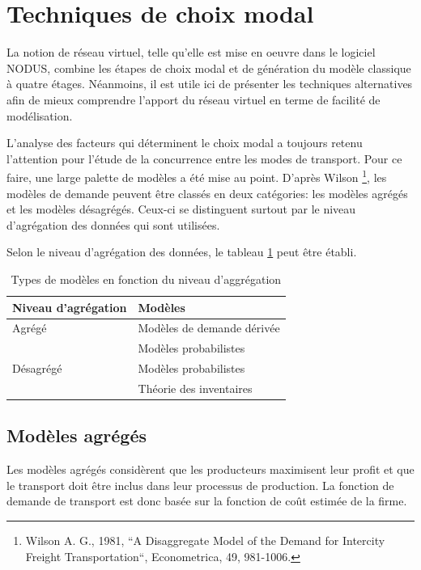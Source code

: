 \section{Techniques de choix modal}

La notion de réseau virtuel, telle qu'elle est mise en oeuvre dans le logiciel
NODUS, combine les étapes de choix modal et de génération du modèle classique à
quatre étages. Néanmoins, il est utile ici de présenter les techniques
alternatives afin de mieux comprendre l'apport du réseau virtuel en terme de
facilité de modélisation.

L'analyse des facteurs qui déterminent le choix modal a toujours
retenu l'atten\-tion pour l'étude de la concurrence entre les modes
de transport. Pour ce faire, une large palette de modèles a été
mise au point. D'après Wilson
\footnote{Wilson A. G., 1981, ``A Disaggregate Model of the Demand
for Intercity Freight Transportation``, Econometrica, 49,
981-1006.}, les modèles de demande peuvent être classés en deux
catégories: les modèles agrégés et les modèles désagrégés. Ceux-ci
se distinguent surtout par le niveau d'agrégation des données qui
sont utilisées.

Selon le niveau d'agrégation des données, le tableau \ref{tab2_6} peut être
établi.

\begin{table}
\begin{center}
\begin{tabular}{ll}
\hline
Niveau d'agrégation & Modèles\\
\hline
Agrégé& Modèles de demande dérivée\\

& Modèles probabilistes\\

Désagrégé& Modèles probabilistes\\

& Théorie des inventaires\\
\hline
\end{tabular}
\caption{\label{tab2_6} Types de mod\`eles en fonction du niveau d'aggr\'egation}
\end{center}
\end{table}



\subsection{Mod\`eles agr\'eg\'es}


Les modèles agrégés considèrent que les producteurs maximisent leur
profit et que le transport doit être inclus dans leur processus de
production. La fonction de demande de transport est donc basée sur
la fonction de coût estimée de la firme.

